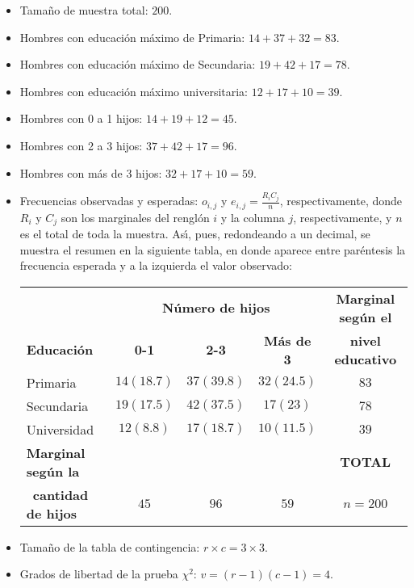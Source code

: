 \begin{solucion}
 \begin{datos}
  $\phantom{0}$
  \begin{itemize}
   \item Tamaño de muestra total: $200$.
   \item Hombres con educaci\'on m\'aximo de Primaria: $14 + 37 + 32 = 83$.
   \item Hombres con educaci\'on m\'aximo de Secundaria: $19 + 42 + 17 = 78$.
   \item Hombres con educaci\'on m\'aximo universitaria: $12 + 17 + 10 = 39$.
   \item Hombres con 0 a 1 hijos: $14 + 19 + 12 = 45$.
   \item Hombres con 2 a 3 hijos: $37 + 42 + 17 = 96$.
   \item Hombres con más de 3 hijos: $32 + 17 + 10 = 59$.
   \item Frecuencias observadas y esperadas: $o_{i,j}$
   y $e_{i,j}=\frac{R_i C_j}{n}$, respectivamente,
   donde $R_i$ y $C_j$ son los marginales del rengl\'on $i$ y la columna $j$,
   respectivamente, y $n$ es el total de toda la muestra.
   As\'{\i}, pues, redondeando a un decimal, se muestra el resumen 
   en la siguiente tabla,
   en donde aparece entre par\'entesis la frecuencia esperada
   y a la izquierda el valor observado:
   \begin{center}
    \begin{tabular}{lccc|c}
     & \multicolumn{3}{c}{\textbf{N\'umero de hijos}} &
     \textbf{Marginal seg\'un el} \\
     \cline{2-4}
     \textbf{Educaci\'on} & \textbf{0-1} & \textbf{2-3} &
     \textbf{M\'as de 3} & \textbf{nivel educativo} \\
     \hline
     Primaria & $14 (18.7)$ & $37 (39.8)$ & $32 (24.5)$ & $83$ \\
     Secundaria & $19 (17.5)$ & $42 (37.5)$ & $17 (23)$ & $78$ \\
     Universidad & $12 (8.8)$ & $17 (18.7)$ & $10 (11.5)$ & $39$ \\
     \hline 
     \textbf{Marginal seg\'un la} & & & & \textbf{TOTAL} \\
     $\,$ \textbf{cantidad de hijos} & $45$ & $96$ & $59$ & $n=200$
    \end{tabular}
   \end{center}
   \item Tama\~no de la tabla de contingencia: $r\times c = 3\times 3$.
   \item Grados de libertad de la prueba $\chi^2$: $v = (r-1)(c-1) = 4$.
  \end{itemize}
 \end{datos}
 

\end{solucion}
